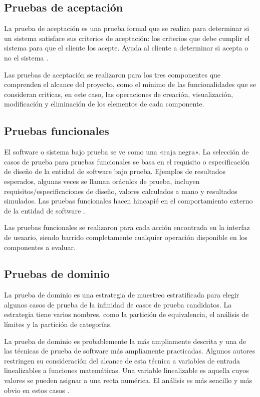 \subsection{Pruebas de aceptación}
La prueba de aceptación es una prueba formal que se realiza para determinar si
un sistema satisface sus criterios de aceptación: los criterios que debe cumplir
el sistema para que el cliente los acepte. Ayuda al cliente a determinar si
acepta o no el sistema \cite{Naik}.

Las pruebas de aceptación se realizaron para los tres componentes que comprenden
el alcance del proyecto, como el mínimo de las funcionalidades que se consideran
criticas, en este caso, las operaciones de creación, visualización, modificación
y eliminación de los elementos de cada componente.

\subsection{Pruebas funcionales}
El software o sistema bajo prueba se ve como una «caja negra». La selección de
casos de prueba para pruebas funcionales se basa en el requisito o
especificación de diseño de la entidad de software bajo prueba. Ejemplos de
resultados esperados, algunas veces se llaman oráculos de prueba, incluyen
requisitos/especificaciones de diseño, valores calculados a mano y resultados
simulados. Las pruebas funcionales hacen hincapié en el comportamiento externo
de la entidad de software \cite{Luo}.

Las pruebas funcionales se realizaron para cada acción encontrada en la interfaz
de usuario, siendo barrido completamente cualquier operación disponible en los
componentes a evaluar.

\subsection{Pruebas de dominio}
La prueba de dominio es una estrategia de muestreo estratificada para elegir
algunos casos de prueba de la infinidad de casos de prueba candidatos. La
estrategia tiene varios nombres, como la partición de equivalencia, el análisis
de límites y la partición de categorías.

La prueba de dominio es probablemente la más ampliamente descrita y una de las
técnicas de prueba de software más ampliamente practicadas. Algunos autores
restringen su consideración del alcance de esta técnica a variables de entrada
linealizables a funciones matemáticas. Una variable linealizable es aquella
cuyos valores se pueden asignar a una recta numérica. El análisis es más
sencillo y más obvio en estos casos \cite{Kaner}.

